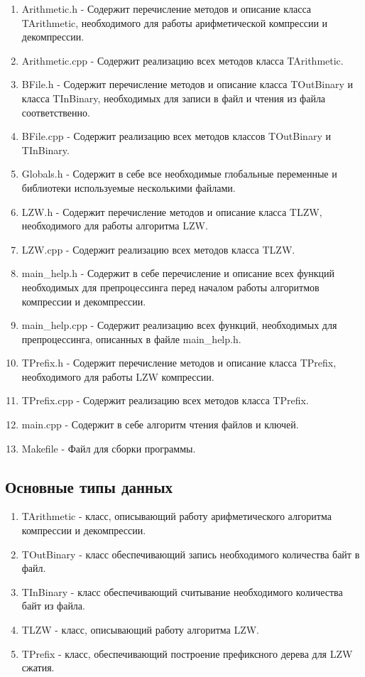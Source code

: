 \documentclass[12pt]{article}
\begin{document}
\begin{enumerate}
	\item Arithmetic.h - Содержит перечисление методов и описание класса TArithmetic, необходимого для работы арифметической компрессии и декомпрессии. 
	\item Arithmetic.cpp - Содержит реализацию всех методов класса TArithmetic.
	\item BFile.h - Содержит перечисление методов и описание класса TOutBinary и класса TInBinary, необходимых для записи в файл и чтения из файла соответственно.
	\item BFile.cpp - Содержит реализацию всех методов классов TOutBinary и TInBinary.
	\item Globals.h - Содержит в себе все необходимые глобальные переменные и библиотеки используемые несколькими файлами.
	\item LZW.h - Содержит перечисление методов и описание класса TLZW, необходимого для работы алгоритма LZW.
	\item LZW.cpp - Содержит реализацию всех методов класса TLZW.
	\item main\_help.h - Содержит в себе перечисление и описание всех функций необходимых для препроцессинга перед началом работы алгоритмов компрессии и декомпрессии.
	\item main\_help.cpp - Содержит реализацию всех функций, необходимых для препроцессинга, описанных в файле main\_help.h.
	\item TPrefix.h - Содержит перечисление методов и описание класса TPrefix, необходимого для работы LZW компрессии.
	\item TPrefix.cpp - Содержит реализацию всех методов класса TPrefix.
	\item main.cpp - Содержит в себе алгоритм чтения файлов и ключей.
	\item Makefile - Файл для сборки программы.
\end{enumerate}

\subsection*{Основные типы данных}

\begin{enumerate}
	\item TArithmetic - класс, описывающий работу арифметического алгоритма компрессии и декомпрессии.
	\item TOutBinary - класс обеспечивающий запись необходимого количества байт в файл.
	\item TInBinary - класс обеспечивающий считывание необходимого количества байт из файла.
	\item TLZW - класс, описывающий работу алгоритма LZW.
	\item TPrefix - класс, обеспечивающий построение префиксного дерева для LZW сжатия.
\end{enumerate}
\end{document}
